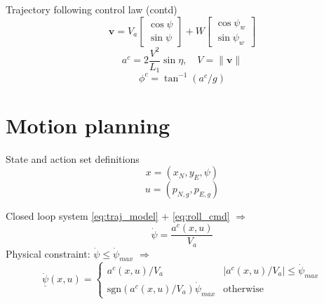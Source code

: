 \documentclass{beamer}
\renewcommand{\vec}[1]{
    \boldsymbol{#1}
}
\begin{document}
\begin{frame}{Trajectory following control law (contd)}
    \begin{equation}
        \vec{v} = V_a\begin{bmatrix}
            \cos\psi \\
            \sin\psi
        \end{bmatrix}
        + W\begin{bmatrix}
            \cos\psi_w\\
            \sin\psi_w
        \end{bmatrix}
    \end{equation}
    \begin{equation}\label{eq:lat_acc}
        a^{c}=2\frac{V^2}{L_1}\sin\eta, \quad V=\|\vec{v}\|
    \end{equation}
    \begin{equation}\label{eq:roll_cmd}
        \phi^{c}=\tan^{-1}(a^{c}/g)
    \end{equation}
\end{frame}

\section{Motion planning}
\begin{frame}{State and action set definitions}
    \begin{equation}
        x=(x_N, y_E, \psi)
    \end{equation}
    \begin{equation}
        u=(p_{N,g}, p_{E,g})
    \end{equation}
\end{frame}

\begin{frame}{Closed loop system}
    \eqref{eq:traj_model} + \eqref{eq:roll_cmd} $\Rightarrow$
    \begin{equation}
        \dot{\psi}=\frac{a^c(x, u)}{V_a}
    \end{equation}
    Physical constraint: $\dot{\psi}\leq\dot{\psi}_{max}$ $\Rightarrow$
    \begin{equation}\label{eq:saturation}
        \underline{\dot{\psi}}(x, u)=\begin{cases}
            a^c(x, u)/V_a & |a^c(x, u)/V_a| \leq \dot{\psi}_{max} \\
            \text{sgn}(a^c(x, u)/V_a)\dot{\psi}_{max} & \text{otherwise}
        \end{cases}
    \end{equation}
\end{frame}
\end{document}
